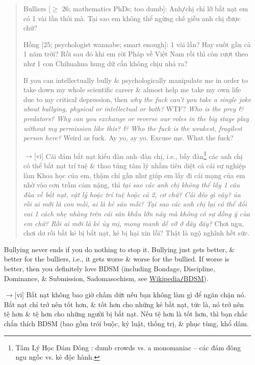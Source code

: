 \documentclass[12pt,oneside]{book}
\begin{document}
\begin{quote}
	{\sf Bulliers [$\ge$ 26; mathematics PhDs; too dumb]}: Anh{\tt/}chị chỉ lỡ bắt nạt em có 1 vài lần thôi mà. Tại sao em không thể ngừng chế giễu anh chị được chứ?
	
	{\sf Hồng [25; psychologist wannabe; smart enough]}: 1 vài lần? Hay suốt gần cả 1 năm trời? Rồi sau đó khi em rời Pháp về Việt Nam rồi thì còn rượt theo như 1 con Chihuahua hung dữ cắn không chịu nhả ra?
	
	If you can intellectually bully \& psychologically manipulate me in order to take down my whole scientific career \& almost help me take my own life due to my critical depression, then {\it why the fuck can't you take a single joke about bullying, physical or intellectual or both?} WTF? {\it Who is the prey \& predators? Why can you exchange or reverse our roles in the big stage play without my permission like this? \&  Who the fuck is the weakest, fragilest person here?} Weird as fuck. Ay yo, ay yo. Excuse me. What the fuck?
	
	{\sf[en]$\to$[vi]} Cái đám bắt nạt kiểu đàn anh--đàn chị, i.e., bầy đàn\footnote{Tâm Lý Học Đám Đông \cite{Bon_crowd_psychology,Bon_crowd_psychology_VN}: dumb crowds vs. a monomaniac -- các đám đông ngu ngốc vs. kẻ độc hành.} các anh chị có thể bắt nạt trí tuệ \& thao túng tâm lý nhằm tiêu diệt cả cái sự nghiệp làm Khoa học của em, thậm chí gần như giúp em lấy đi cái mạng của em nhờ vào cơn trầm cảm nặng, thì {\it tại sao các anh chị không thể lấy 1 câu đùa về bắt nạt, vật lý hoặc trí tuệ hoặc cả 2, cơ chứ? Cái đéo gì vậy? ủa rồi ai mới là con mồi, ai là kẻ săn mồi? Tại sao các anh chị lại có thể đổi vai 1 cách nhẹ nhàng trên cái sân khấu lớn này mà không có sự đồng ý của em chứ? Rồi ai mới là kẻ ủy mị, mong manh dễ vỡ ở đây đây?} Chơi ngu, chơi dơ rồi bắt kẻ bị bắt nạt, kẻ bị hại xin lỗi? Thật là ngộ nghĩnh hết sức.
\end{quote}
Bullying never ends if you do nothing to stop it. Bullying just gets better, \& better for the bulliers, i.e., it gets worse \& worse for the bullied. If worse is better, then you definitely love BDSM (including Bondage, Discipline, Dominance, \& Submission, Sadomasochism, see \href{https://en.wikipedia.org/wiki/BDSM}{Wikipedia{\tt/}BDSM}).

{\sf[en]$\to$[vi]} Bắt nạt không bao giờ chấm dứt nếu bạn không làm gì để ngăn chặn nó. Bắt nạt chỉ trở nên tốt hơn, \& tốt hơn cho những kẻ bắt nạt, tức là, nó trở nên tệ hơn \& tệ hơn cho những người bị bắt nạt. Nếu tệ hơn là tốt hơn, thì bạn chắc chắn thích BDSM (bao gồm trói buộc, kỷ luật, thống trị, \& phục tùng, khổ dâm.
\end{document}
